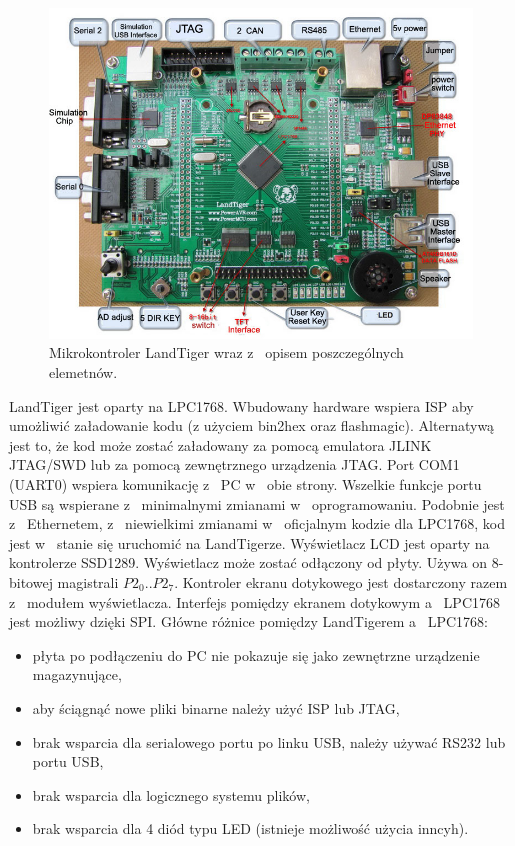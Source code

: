 \documentclass{BscUS}
\begin{document}
\begin{figure}[h]
\centering
\includegraphics{./img/landTiger3}
\caption{Mikrokontroler LandTiger wraz z~ opisem poszczególnych elemetnów. \cite{landTiger3}}
\end{figure}
LandTiger jest oparty na LPC1768. Wbudowany hardware wspiera ISP aby umożliwić załadowanie kodu (z użyciem bin2hex oraz flashmagic).
Alternatywą jest to, że kod może zostać załadowany za pomocą emulatora JLINK JTAG/SWD lub za pomocą zewnętrznego urządzenia JTAG.
\newline
Port COM1 (UART0) wspiera komunikację z~ PC w~ obie strony. Wszelkie funkcje portu USB są wspierane z~ minimalnymi zmianami w~ oprogramowaniu. Podobnie jest z~ Ethernetem, z~ niewielkimi  zmianami w~ oficjalnym kodzie dla LPC1768, kod jest w~ stanie się uruchomić na LandTigerze.
\newline
\indent Wyświetlacz LCD jest oparty na kontrolerze SSD1289. Wyświetlacz może zostać odłączony od płyty. Używa on 8-bitowej magistrali \(P2_0..P2_7\). Kontroler ekranu dotykowego jest dostarczony razem z~ modułem wyświetlacza. Interfejs pomiędzy ekranem dotykowym a~ LPC1768 jest możliwy dzięki SPI.
\newline
Główne różnice pomiędzy LandTigerem a~ LPC1768:
\begin{itemize} %
\item płyta po podłączeniu do PC nie pokazuje się jako zewnętrzne urządzenie magazynujące,
\item aby ściągnąć nowe pliki binarne należy użyć ISP lub JTAG,
\item brak wsparcia dla serialowego portu po linku USB, należy używać RS232 lub portu USB,
\item brak wsparcia dla logicznego systemu plików,
\item brak wsparcia dla 4 diód typu LED (istnieje możliwość użycia inncyh).
\end{itemize}
\end{document}
